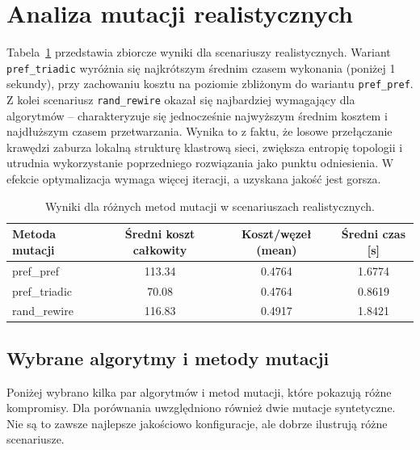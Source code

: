\section{Analiza mutacji realistycznych}
Tabela~\ref{tab:dyn-real-warm} przedstawia zbiorcze wyniki dla scenariuszy realistycznych. Wariant \texttt{pref\_triadic} wyróżnia się najkrótszym średnim czasem wykonania (poniżej 1 sekundy), przy zachowaniu kosztu na poziomie zbliżonym do wariantu \texttt{pref\_pref}. Z kolei scenariusz \texttt{rand\_rewire} okazał się najbardziej wymagający dla algorytmów -- charakteryzuje się jednocześnie najwyższym średnim kosztem i najdłuższym czasem przetwarzania. Wynika to z faktu, że losowe przełączanie krawędzi zaburza lokalną strukturę klastrową sieci, zwiększa entropię topologii i utrudnia wykorzystanie poprzedniego rozwiązania jako punktu odniesienia. W efekcie optymalizacja wymaga więcej iteracji, a uzyskana jakość jest gorsza.


\begin{table}[H]
  \centering
  \caption{Wyniki dla różnych metod mutacji w scenariuszach realistycznych.}
  \label{tab:dyn-real-warm}
  \begin{tabular}{lccc}
    \toprule
    \textbf{Metoda mutacji} & \textbf{Średni koszt całkowity} & \textbf{Koszt/węzeł (mean)} & \textbf{Średni czas [s]} \\
    \midrule
    pref\_pref              & 113.34                          & 0.4764                      & 1.6774                   \\
    pref\_triadic           & 70.08                           & 0.4764                      & 0.8619                   \\
    rand\_rewire            & 116.83                          & 0.4917                      & 1.8421                   \\
    \bottomrule
  \end{tabular}
\end{table}

\subsection{Wybrane algorytmy i metody mutacji}
Poniżej wybrano kilka par algorytmów i metod mutacji, które pokazują różne kompromisy. Dla porównania uwzględniono również dwie mutacje syntetyczne. Nie są to zawsze najlepsze jakościowo konfiguracje, ale dobrze ilustrują różne scenariusze.

